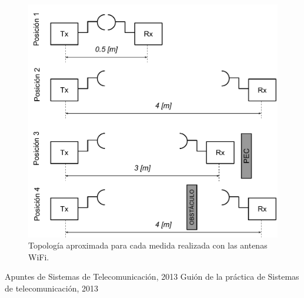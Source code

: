 \documentclass[10pt,conference,a4paper]{IEEEtran}
\begin{document}
\begin{figure}[htb]
    \centering
    \includegraphics[width=\columnwidth]{figuras/posicion_antenas_wifi.pdf}
    \caption{Topología aproximada para cada medida realizada con las antenas WiFi.}
    \label{fig:posiciones_wifi}
\end{figure}


\begin{thebibliography}{2}                                                 %
    Apuntes de Sistemas de Telecomunicación, 2013
    Guión de la práctica de Sistemas de telecomunicación, 2013
\end{thebibliography}
\end{document}
